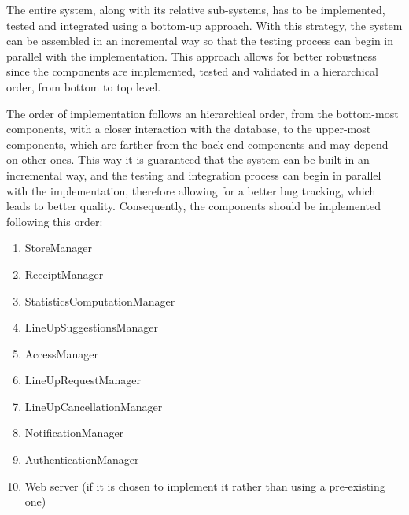 \documentclass[../../main.tex]{subfiles}
\begin{document}
The entire system, along with its relative sub-systems, has to be implemented, tested and integrated using a bottom-up approach. 
With this strategy, the system can be assembled in an incremental way so that the testing process can begin in parallel with the implementation. 
This approach allows for better robustness since the components are implemented, tested and validated in a hierarchical order, from bottom to top level.


The order of implementation follows an hierarchical order, from the bottom-most components, with a closer interaction with the database, to the upper-most components, which are farther from the back end components and may depend on other ones. 
This way it is guaranteed that the system can be built in an incremental way, and the testing and integration process can begin in parallel with the implementation, therefore allowing for a better bug tracking, which leads to better quality. 
Consequently, the components should be implemented following this order:

\begin{enumerate}

	\item StoreManager
	\item ReceiptManager
	\item StatisticsComputationManager
	\item LineUpSuggestionsManager
	\item AccessManager
	\item LineUpRequestManager
	\item LineUpCancellationManager
	\item NotificationManager
	\item AuthenticationManager
	\item Web server (if it is chosen to implement it rather than using a pre-existing one)

\end{enumerate}

\end{document}
